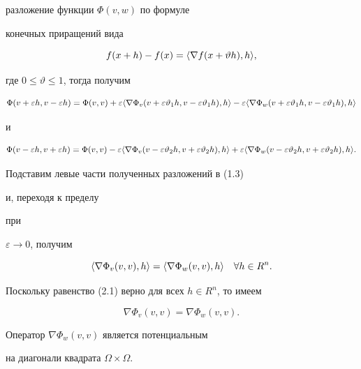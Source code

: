 разложение функции $\Phi(v,w)$ по формуле


конечных приращений вида


\begin{equation}


f(x+h)-f(x)=\la\nabla f(x+\vartheta h),h\ra,


\end{equation}


где $0\le\vartheta\le 1$, тогда получим


$$


\Phi(v+\varepsilon h,v-\varepsilon h)=\Phi(v,v)+\varepsilon


\la\nabla\Phi_v(v+\varepsilon\vartheta_1h,v-\varepsilon\vartheta_1h),h


\ra-\varepsilon\la\nabla\Phi_w(v+\varepsilon\vartheta_1h,


v-\varepsilon\vartheta_1h),h\ra


$$


и


$$


\Phi(v-\varepsilon h,v+\varepsilon h)=\Phi(v,v)-\varepsilon


\la\nabla\Phi_v(v-\varepsilon\vartheta_2h,v+\varepsilon\vartheta_2h),h


\ra+\varepsilon\la\nabla\Phi_w(v-\varepsilon\vartheta_2h,


v+\varepsilon\vartheta_2h),h\ra.


$$





Подставим левые части полученных разложений в (1.3)


и, переходя к пределу


при


$\varepsilon\to 0$, получим


$$


\la\nabla\Phi_v(v,v),h\ra=


\la\nabla\Phi_w(v,v),h\ra\quad \forall h\in R^n.


$$


Поскольку равенство (2.1) верно для всех $h\in R^n$, то имеем


\begin{equation}


\nabla\Phi_v(v,v)=\nabla\Phi_w(v,v).


\end{equation}





\begin{pty} Оператор $\nabla\Phi_w(v,v)$ является потенциальным


на диагонали квадрата $\Omega\times\Omega$.


\end{pty}





